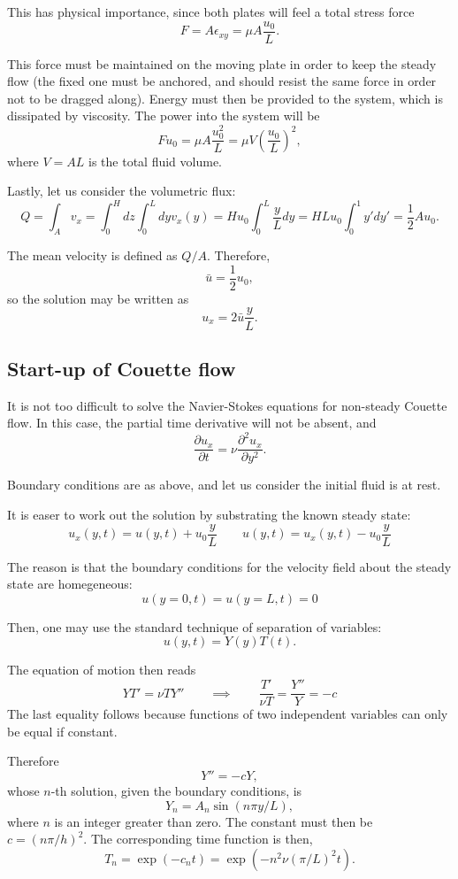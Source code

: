 This has physical importance, since both plates will feel a total
stress force
\[
F= A \epsilon_{xy} = \mu A \frac{u_0}{L} .
\]

This force must be maintained on the moving plate in order to keep the
steady flow (the fixed one must be anchored, and should resist the
same force in order not to be dragged along). Energy must then be
provided to the system, which is dissipated by viscosity. The power
into the system will be
\[
F u_0 = \mu A \frac{u_0^2}{L} = \mu V  \left( \frac{u_0}{L}\right)^2 ,
\]
where $V=AL$ is the total fluid volume.

Lastly, let us consider the volumetric flux:
\[
Q = \int_A v_x = \int_0^H dz \int_0^L dy v_x(y) =
H  u_0 \int_0^L \frac{y}{L} dy =
H L  u_0 \int_0^1 y' dy' =
\frac12 A u_0 .
\]

The mean velocity is defined as $Q/A$. Therefore,
\[
\bar{u} = \frac12 u_0 ,
\]
so the solution may be written as
\[
u_x =   2\bar{u} \frac{y}{L} .
\]




\subsection{Start-up of Couette flow}

It is not too difficult to solve the Navier-Stokes equations for
non-steady Couette flow. In this case, the partial time derivative
will not be absent, and
\[
{\frac {\partial u_x}{\partial t}}=\nu {\frac {\partial
    ^{2}u_x}{\partial y^{2}}}.
\]

Boundary conditions are as above, and let us consider the initial
fluid is at rest.

It is easer to work out the solution by substrating the known steady state:
\[
u_x(y,t) = u(y,t)  + u_0 \frac{y}{L} \qquad
u(y,t) = u_x(y,t)  - u_0 \frac{y}{L} 
\]

The reason is that the boundary conditions for the velocity field
about the steady state are homegeneous:
\[
u(y=0,t) = u(y=L,t) = 0
\]

Then, one may use the standard technique of separation of variables:
\[
u(y,t) = Y(y) T(t) .
\]

The equation of motion then reads
\[
Y T' = \nu T Y'' \qquad\implies\qquad  \frac{T'}{ \nu T} = \frac{Y''}{Y} = -c
\]
The last equality follows because functions of two independent
variables can only be equal if constant.

Therefore
\[
Y''= - c Y ,
\]
whose $n$-th solution, given the boundary conditions, is
\[
Y_n= A_n \sin(n\pi y/L),
\]
where $n$ is an integer greater than zero. The constant must then be
$c=(n\pi/h)^2$. The corresponding time function is then,
\[
T_n=\exp(-c_n t) = \exp(-  n^2 \nu (\pi/L)^2   t) .
\]

